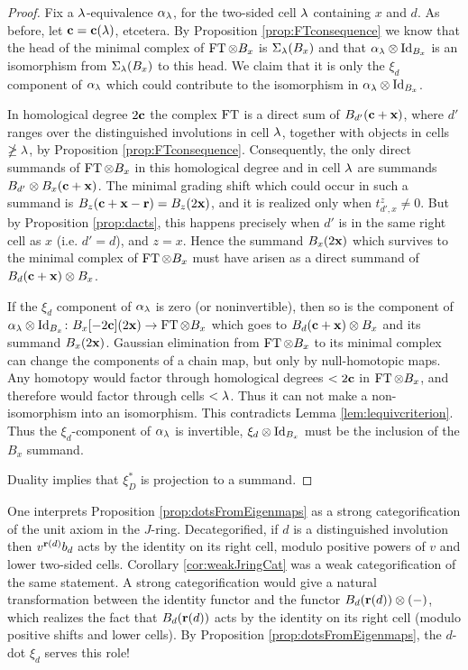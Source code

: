 \begin{proof}
Fix a $\lambda$-equivalence $\alpha_\lambda$, for the two-sided cell $\lambda$ containing $x$ and $d$. As before, let $\mathbf{c} = \mathbf{c}(\lambda)$, etcetera. By Proposition \ref{prop:FTconsequence} we know that the head of the minimal complex of $\operatorname{FT} \otimes B_x$ is $\Sigma_\lambda(B_x)$ and that $\alpha_\lambda \otimes \operatorname{Id}_{B_x}$ is an isomorphism from $\Sigma_\lambda(B_x)$ to this head. We claim that it is only the $\xi_d$ component of $\alpha_\lambda$ which could contribute to the isomorphism in $\alpha_\lambda \otimes \operatorname{Id}_{B_x}$.

In homological degree $2\mathbf{c}$ the complex $\operatorname{FT}$ is a direct sum of $B_{d'}(\mathbf{c}+\mathbf{x})$, where $d'$ ranges over the distinguished involutions in cell $\lambda$, together with objects in cells
$\ngeq \lambda$, by Proposition \ref{prop:FTconsequence}. Consequently, the only direct summands of $\operatorname{FT} \otimes B_x$ in this homological degree and in cell $\lambda$ are summands $B_{d'} \otimes B_x(\mathbf{c}
+ \mathbf{x})$. The minimal grading shift which could occur in such a summand is $B_z(\mathbf{c} + \mathbf{x} - \mathbf{r}) = B_z(2\mathbf{x})$, and it is realized only when $t_{d',x}^z \ne 0$. But by Proposition
\ref{prop:dacts}, this happens precisely when $d'$ is in the same right cell as $x$ (i.e. $d' = d$), and $z = x$. Hence the summand $B_x(2\mathbf{x})$ which survives to the minimal complex of
$\operatorname{FT} \otimes B_x$ must have arisen as a direct summand of $B_d(\mathbf{c} + \mathbf{x}) \otimes B_x$.

If the $\xi_d$ component of $\alpha_\lambda$ is zero (or noninvertible), then so is the component of $\alpha_\lambda \otimes \operatorname{Id}_{B_x} \colon B_x[-2\mathbf{c}](2\mathbf{x}) \rightarrow \operatorname{FT} \otimes B_x$ which goes to $B_d(\mathbf{c}+\mathbf{x}) \otimes
B_x$ and its summand $B_x(2\mathbf{x})$. Gaussian elimination from $\operatorname{FT} \otimes B_x$ to its minimal complex can change the components of a chain map, but only by null-homotopic maps. Any homotopy
would factor through homological degrees $< 2\mathbf{c}$ in $\operatorname{FT} \otimes B_x$, and therefore would factor through cells $< \lambda$. Thus it can not make a non-isomorphism into an isomorphism. This
contradicts Lemma \ref{lem:lequivcriterion}. Thus the $\xi_d$-component of $\alpha_\lambda$ is invertible, $\xi_d \otimes \operatorname{Id}_{B_x}$ must be the inclusion of the $B_x$ summand.

Duality implies that $\xi_D^\ast$ is projection to a summand. \end{proof}

One interprets Proposition \ref{prop:dotsFromEigenmaps} as a strong categorification of the unit axiom in the $J$-ring. Decategorified, if $d$ is a distinguished involution then
$v^{\mathbf{r}(d)} b_d$ acts by the identity on its right cell, modulo positive powers of $v$ and lower two-sided cells. Corollary \ref{cor:weakJringCat} was a weak categorification of the
same statement. A strong categorification would give a natural transformation between the identity functor and the functor $B_d(\mathbf{r}(d)) \otimes (-)$, which realizes the fact that
$B_d(\mathbf{r}(d))$ acts by the identity on its right cell (modulo positive shifts and lower cells). By Proposition \ref{prop:dotsFromEigenmaps}, the $d$-dot $\xi_d$ serves this role!

